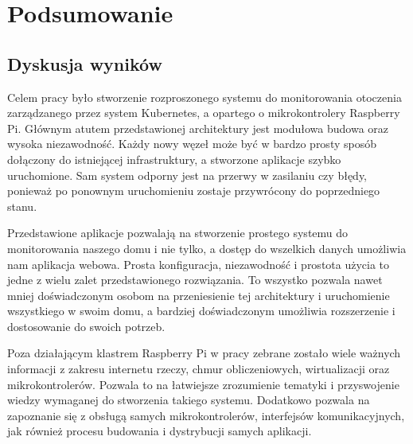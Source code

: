 \documentclass[12pt]{report}
\let\Oldsection\section
\renewcommand{\section}{\FloatBarrier\Oldsection}
\begin{document}
{\chapter{Podsumowanie}
\section{Dyskusja wyników}
Celem pracy było stworzenie rozproszonego systemu do monitorowania otoczenia zarządzanego przez system Kubernetes, a opartego o mikrokontrolery Raspberry Pi. Głównym atutem przedstawionej architektury jest modułowa budowa oraz wysoka niezawodność. Każdy nowy węzeł może być w bardzo prosty sposób dołączony do istniejącej infrastruktury, a stworzone aplikacje szybko uruchomione. Sam system odporny jest na przerwy w zasilaniu czy błędy, ponieważ po ponownym uruchomieniu zostaje przywrócony do poprzedniego stanu.

Przedstawione aplikacje pozwalają na stworzenie prostego systemu do monitorowania naszego domu i nie tylko, a dostęp do wszelkich danych umożliwia nam aplikacja webowa. Prosta konfiguracja, niezawodność i prostota użycia to jedne z wielu zalet przedstawionego rozwiązania. To wszystko pozwala nawet mniej doświadczonym osobom na przeniesienie tej architektury i uruchomienie wszystkiego w swoim domu, a bardziej doświadczonym umożliwia rozszerzenie i dostosowanie do swoich potrzeb.

Poza działającym klastrem Raspberry Pi w pracy zebrane zostało wiele ważnych informacji z zakresu internetu rzeczy, chmur obliczeniowych, wirtualizacji oraz mikrokontrolerów. Pozwala to na łatwiejsze zrozumienie tematyki i przyswojenie wiedzy wymaganej do stworzenia takiego systemu. Dodatkowo pozwala na zapoznanie się z obsługą samych mikrokontrolerów, interfejsów komunikacyjnych, jak również procesu budowania i dystrybucji samych aplikacji.

}
\end{document}
